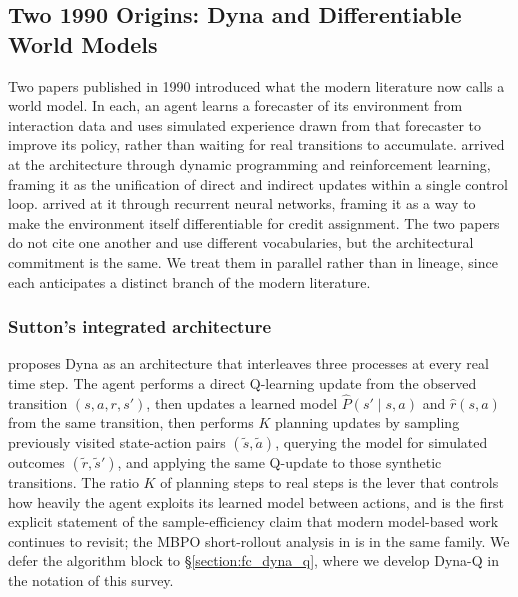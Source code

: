 \subsection{Two 1990 Origins: Dyna and Differentiable World Models}
\label{section:fc_origins1990}

Two papers published in 1990 introduced what the modern literature now calls a world model. In each, an agent learns a forecaster of its environment from interaction data and uses simulated experience drawn from that forecaster to improve its policy, rather than waiting for real transitions to accumulate. \citet{sutton1990} arrived at the architecture through dynamic programming and reinforcement learning, framing it as the unification of direct and indirect updates within a single control loop. \citet{Schmidhuber1990} arrived at it through recurrent neural networks, framing it as a way to make the environment itself differentiable for credit assignment. The two papers do not cite one another and use different vocabularies, but the architectural commitment is the same. We treat them in parallel rather than in lineage, since each anticipates a distinct branch of the modern literature.

\subsubsection{Sutton's integrated architecture}
\label{section:fc_origins_sutton}

\citet{sutton1990} proposes Dyna as an architecture that interleaves three processes at every real time step. The agent performs a direct Q-learning update from the observed transition $(s, a, r, s')$, then updates a learned model $\widehat{P}(s' \mid s, a)$ and $\widehat{r}(s, a)$ from the same transition, then performs $K$ planning updates by sampling previously visited state-action pairs $(\tilde{s}, \tilde{a})$, querying the model for simulated outcomes $(\tilde{r}, \tilde{s}')$, and applying the same Q-update to those synthetic transitions. The ratio $K$ of planning steps to real steps is the lever that controls how heavily the agent exploits its learned model between actions, and is the first explicit statement of the sample-efficiency claim that modern model-based work continues to revisit; the MBPO short-rollout analysis in \citet{janner2019model} is in the same family. We defer the algorithm block to \S\ref{section:fc_dyna_q}, where we develop Dyna-Q in the notation of this survey.

